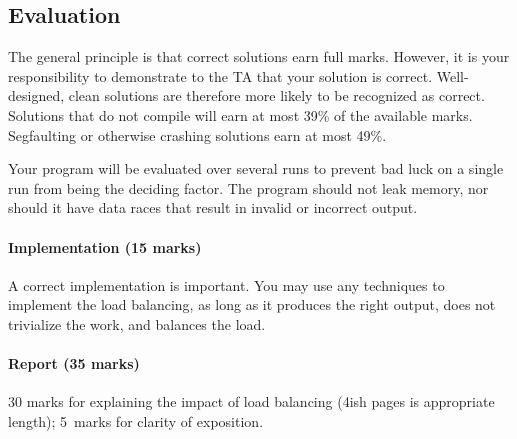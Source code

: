 \documentclass[letterpaper,10pt]{article}
\begin{document}
\subsection{Evaluation}

The general principle is that correct solutions earn full marks.
However, it is your responsibility to demonstrate to the TA
that your solution is correct. Well-designed, clean solutions 
are therefore more likely to be recognized as correct. Solutions that do not compile will earn at most 39\% of the available
marks. Segfaulting or otherwise crashing solutions earn
at most 49\%.

Your program will be evaluated over several runs to prevent bad luck on a single run from being the deciding factor. The program should not leak memory, nor should it have data races that result in invalid or incorrect output. 


\paragraph{Implementation (15 marks)} A correct implementation is important. You may use any techniques to implement the load balancing, as long as it produces the right output, does not trivialize the work, and balances the load.



\paragraph{Report (35 marks)} 30 marks for explaining the impact of load balancing (4ish pages is appropriate length); 5~marks for clarity of exposition.
\end{document}
